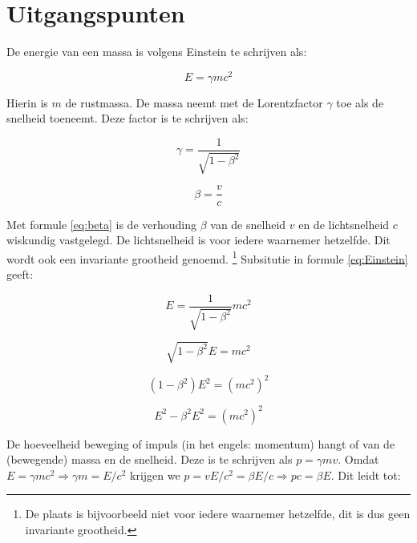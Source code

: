 \section{\label{sec:Uitgangspunten}Uitgangspunten}
\begin{multicols}{2}

De energie van een massa is volgens Einstein te schrijven als:

\begin{equation}
E=\gamma mc^{2}\label{eq:Einstein}
\end{equation}


Hierin is $m$ de rustmassa. De massa neemt met de Lorentzfactor $\gamma$
toe als de snelheid toeneemt. Deze factor is te schrijven als: 

\begin{equation}
\gamma=\frac{1}{\sqrt{1-\beta^{2}}}
\end{equation}


\begin{equation}
\beta=\frac{v}{c}\label{eq:beta}
\end{equation}


Met formule \ref{eq:beta} is de verhouding $\beta$ van de snelheid
$v$ en de lichtsnelheid $c$ wiskundig vastgelegd. De lichtsnelheid
is voor iedere waarnemer hetzelfde. Dit wordt ook een invariante grootheid
genoemd.%
\footnote{De plaats is bijvoorbeeld niet voor iedere waarnemer hetzelfde, dit
is dus geen invariante grootheid.%
} Subsitutie in formule \ref{eq:Einstein} geeft:

\begin{equation}
E=\frac{1}{\sqrt{1-\beta^{2}}}mc^{2}
\end{equation}

\begin{equation}
\sqrt{1-\beta^{2}}E=mc^{2}
\end{equation}

\begin{equation}
\left(1-\beta^{2}\right)E^{2}=\left(mc^{2}\right)^{2}
\end{equation}

\begin{equation}
E^{2}-\beta^{2}E^{2}=\left(mc^{2}\right)^{2}
\end{equation}

De hoeveelheid beweging of impuls (in het engels: momentum) hangt
of van de (bewegende) massa en de snelheid. Deze is te schrijven als $p=\gamma mv$.
Omdat $E=\gamma mc^{2}\Rightarrow\gamma m=E/c^{2}$ krijgen we $p=vE/c^{2}=\beta E/c\Rightarrow pc=\beta E$.
Dit leidt tot:


\end{multicols}

